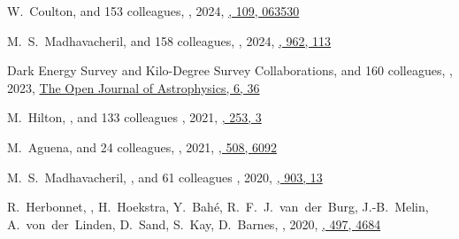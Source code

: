 \begin{etaremune}
\item
W.~Coulton, and 153 colleagues,
,
2024, \href{https://ui.adsabs.harvard.edu/abs/2024PhRvD.109f3530C}{\prd, 109, 063530}

\item
M.~S.~Madhavacheril, and 158 colleagues,
,
2024, \href{https://ui.adsabs.harvard.edu/abs/2024ApJ...962..113M}{\apj, 962, 113}

\item
Dark Energy Survey and Kilo-Degree Survey Collaborations, and 160 colleagues,
,
2023, \href{https://ui.adsabs.harvard.edu/abs/2023OJAp....6E..36D}{The Open Journal of Astrophysics, 6, 36}

\item
M.~Hilton, \myself, and 133 colleagues
,
2021, \href{https://ui.adsabs.harvard.edu/abs/2021ApJS..253....3H/abstract}{\apjs, 253, 3}

\item
M.~Aguena, and 24 colleagues,
,
2021, \href{https://ui.adsabs.harvard.edu/abs/2021MNRAS.508.6092A}{\mnras, 508, 6092}

\item
M.~S.~Madhavacheril, \myself, and 61 colleagues
,
2020, \href{https://ui.adsabs.harvard.edu/abs/2020ApJ...903L..13M/abstract}{\apjl, 903, 13}

\item
R.~Herbonnet, \myself, H.~Hoekstra, Y.~Bah\'e, R.~F.~J.~van~der~Burg, 
J.-B.~Melin, A.~von~der~Linden, D.~Sand, S.~Kay, D.~Barnes,
,
2020, \href{https://ui.adsabs.harvard.edu/abs/2020MNRAS.497.4684H/abstract}{\mnras, 497, 4684}


\end{etaremune}

